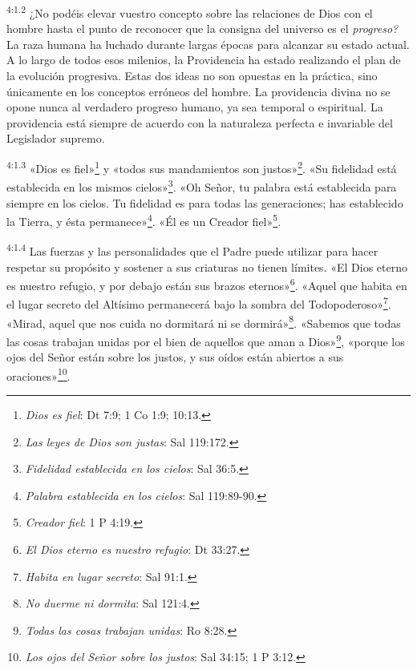 \par
\textsuperscript{4:1.2} ¿No podéis elevar vuestro concepto sobre las relaciones de Dios con el hombre hasta el punto de reconocer que la consigna del universo es el \textit{progreso?} La raza humana ha luchado durante largas épocas para alcanzar su estado actual. A lo largo de todos esos milenios, la Providencia ha estado realizando el plan de la evolución progresiva. Estas dos ideas no son opuestas en la práctica, sino únicamente en los conceptos erróneos del hombre. La providencia divina no se opone nunca al verdadero progreso humano, ya sea temporal o espiritual. La providencia está siempre de acuerdo con la naturaleza perfecta e invariable del Legislador supremo.

\par
\textsuperscript{4:1.3} «Dios es fiel»\footnote{\textit{Dios es fiel}: Dt 7:9; 1 Co 1:9; 10:13.} y «todos sus mandamientos son justos»\footnote{\textit{Las leyes de Dios son justas}: Sal 119:172.}. «Su fidelidad está establecida en los mismos cielos»\footnote{\textit{Fidelidad establecida en los cielos}: Sal 36:5.}. «Oh Señor, tu palabra está establecida para siempre en los cielos. Tu fidelidad es para todas las generaciones; has establecido la Tierra, y ésta permanece»\footnote{\textit{Palabra establecida en los cielos}: Sal 119:89-90.}. «Él es un Creador fiel»\footnote{\textit{Creador fiel}: 1 P 4:19.}.

\par
\textsuperscript{4:1.4} Las fuerzas y las personalidades que el Padre puede utilizar para hacer respetar su propósito y sostener a sus criaturas no tienen límites. «El Dios eterno es nuestro refugio, y por debajo están sus brazos eternos»\footnote{\textit{El Dios eterno es nuestro refugio}: Dt 33:27.}. «Aquel que habita en el lugar secreto del Altísimo permanecerá bajo la sombra del Todopoderoso»\footnote{\textit{Habita en lugar secreto}: Sal 91:1.}. «Mirad, aquel que nos cuida no dormitará ni se dormirá»\footnote{\textit{No duerme ni dormita}: Sal 121:4.}. «Sabemos que todas las cosas trabajan unidas por el bien de aquellos que aman a Dios»\footnote{\textit{Todas las cosas trabajan unidas}: Ro 8:28.}, «porque los ojos del Señor están sobre los justos, y sus oídos están abiertos a sus oraciones»\footnote{\textit{Los ojos del Señor sobre los justos}: Sal 34:15; 1 P 3:12.}.

